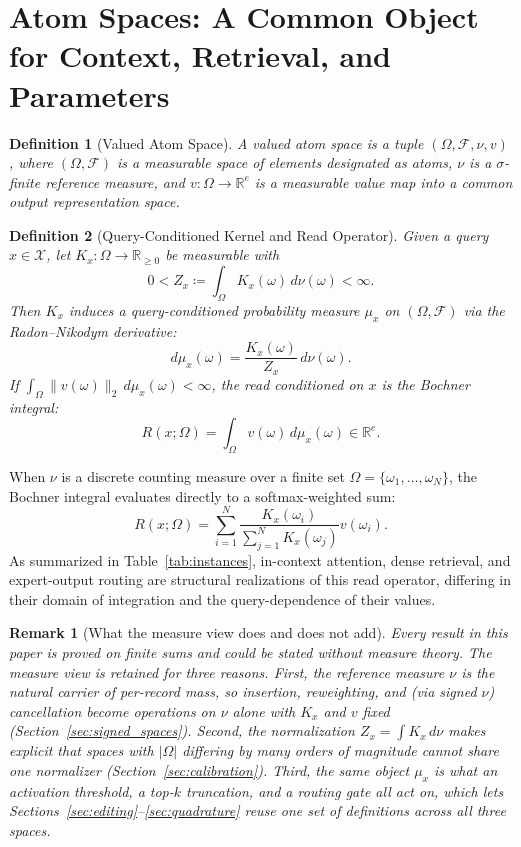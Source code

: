 \documentclass[preprint,12pt]{elsarticle}
\newtheorem{definition}{Definition}
\newtheorem{remark}{Remark}
\newcommand{\R}{\mathbb{R}}
\newcommand{\Om}{\Omega}
\begin{document}
\section{Atom Spaces: A Common Object for Context, Retrieval, and Parameters}
\label{sec:atomspaces}

\begin{definition}[Valued Atom Space]
A \emph{valued atom space} is a tuple $(\Om, \mathcal{F}, \nu, v)$, where $(\Om,\mathcal{F})$ is a measurable space of elements designated as \emph{atoms}, $\nu$ is a $\sigma$-finite reference measure, and $v : \Om \to \R^e$ is a measurable \emph{value map} into a common output representation space.
\end{definition}

\begin{definition}[Query-Conditioned Kernel and Read Operator]
Given a query $x\in\mathcal X$, let $K_x : \Om \to \R_{\ge 0}$ be measurable with
\[
  0 < Z_x \coloneqq \int_\Om K_x(\omega)\,d\nu(\omega) < \infty.
\]
Then $K_x$ induces a query-conditioned probability measure $\mu_x$ on $(\Om, \mathcal{F})$ via the Radon--Nikodym derivative:
\[
  d\mu_x(\omega) = \frac{K_x(\omega)}{Z_x}\, d\nu(\omega).
\]
If $\int_\Om\|v(\omega)\|_2\,d\mu_x(\omega)<\infty$, the \emph{read} conditioned on $x$ is the Bochner integral:
\[
  R(x; \Om) = \int_\Om v(\omega)\, d\mu_x(\omega) \in \R^e.
\]
\end{definition}

When $\nu$ is a discrete counting measure over a finite set $\Om = \{\omega_1, \dots, \omega_N\}$, the Bochner integral evaluates directly to a softmax-weighted sum:
\[
  R(x; \Om) = \sum_{i=1}^N \frac{K_x(\omega_i)}{\sum_{j=1}^N K_x(\omega_j)} v(\omega_i).
\]
As summarized in Table~\ref{tab:instances}, in-context attention, dense retrieval, and expert-output routing are structural realizations of this read operator, differing in their domain of integration and the query-dependence of their values.

\begin{remark}[What the measure view does and does not add]
Every result in this paper is proved on finite sums and could be stated without measure theory. The measure view is retained for three reasons. First, the reference measure $\nu$ is the natural carrier of per-record mass, so insertion, reweighting, and (via signed $\nu$) cancellation become operations on $\nu$ alone with $K_x$ and $v$ fixed (Section~\ref{sec:signed_spaces}). Second, the normalization $Z_x=\int K_x\,d\nu$ makes explicit that spaces with $|\Om|$ differing by many orders of magnitude cannot share one normalizer (Section~\ref{sec:calibration}). Third, the same object $\mu_x$ is what an activation threshold, a top-$k$ truncation, and a routing gate all act on, which lets Sections~\ref{sec:editing}--\ref{sec:quadrature} reuse one set of definitions across all three spaces.
\end{remark}
\end{document}
